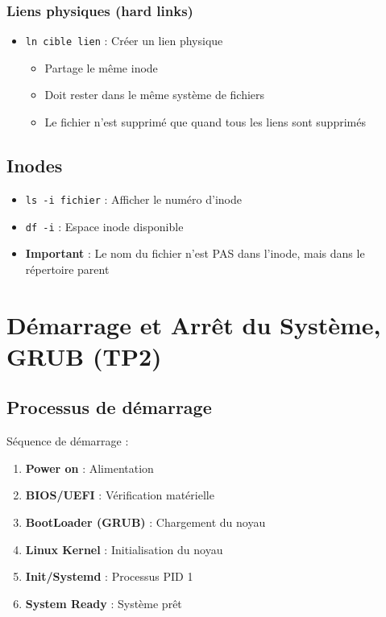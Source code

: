 \documentclass[12pt,a4paper]{article}
\begin{document}
\subsubsection{Liens physiques (hard links)}
\begin{itemize}
    \item \texttt{ln cible lien} : Créer un lien physique
    \begin{itemize}
        \item Partage le même inode
        \item Doit rester dans le même système de fichiers
        \item Le fichier n'est supprimé que quand tous les liens sont supprimés
    \end{itemize}
\end{itemize}

\subsection{Inodes}

\begin{itemize}
    \item \texttt{ls -i fichier} : Afficher le numéro d'inode
    \item \texttt{df -i} : Espace inode disponible
    \item \textbf{Important} : Le nom du fichier n'est PAS dans l'inode, mais dans le répertoire parent
\end{itemize}


\section{Démarrage et Arrêt du Système, GRUB (TP2)}

\subsection{Processus de démarrage}

Séquence de démarrage :
\begin{enumerate}
    \item \textbf{Power on} : Alimentation
    \item \textbf{BIOS/UEFI} : Vérification matérielle
    \item \textbf{BootLoader (GRUB)} : Chargement du noyau
    \item \textbf{Linux Kernel} : Initialisation du noyau
    \item \textbf{Init/Systemd} : Processus PID 1
    \item \textbf{System Ready} : Système prêt
\end{enumerate}
\end{document}
